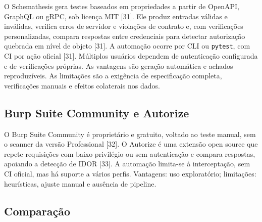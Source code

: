 O Schemathesis gera testes baseados em propriedades a partir de OpenAPI,
GraphQL ou gRPC, sob licença MIT {[}31{]}. Ele produz entradas válidas e
inválidas, verifica erros de servidor e violações de contrato e, com
verificações personalizadas, compara respostas entre credenciais para
detectar autorização quebrada em nível de objeto {[}31{]}. A automação
ocorre por CLI ou \texttt{pytest}, com CI por ação oficial {[}31{]}.
Múltiplos usuários dependem de autenticação configurada e de
verificações próprias. As vantagens são geração automática e achados
reproduzíveis. As limitações são a exigência de especificação completa,
verificações manuais e efeitos colaterais nos dados.

\subsection{Burp Suite Community e
Autorize}\label{burp-suite-community-e-autorize}

O Burp Suite Community é proprietário e gratuito, voltado ao teste
manual, sem o scanner da versão Professional {[}32{]}. O Autorize é uma
extensão open source que repete requisições com baixo privilégio ou sem
autenticação e compara respostas, apoiando a detecção de IDOR {[}33{]}.
A automação limita-se à interceptação, sem CI oficial, mas há suporte a
vários perfis. Vantagens: uso exploratório; limitações: heurísticas,
ajuste manual e ausência de pipeline.

\subsection{Comparação}\label{comparauxe7uxe3o}

